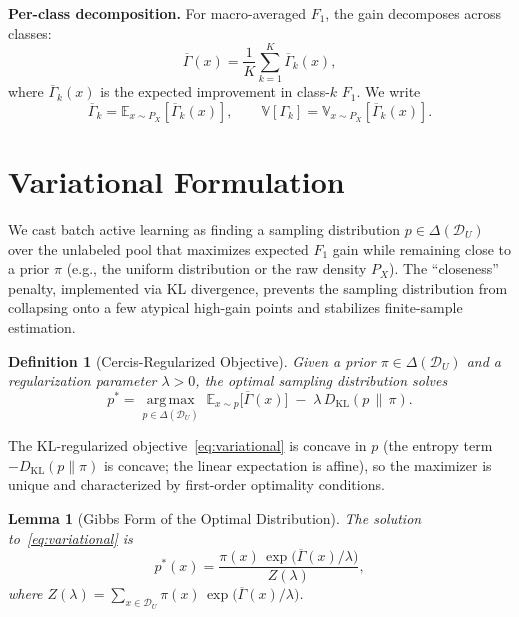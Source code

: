 \documentclass[12pt,a4paper]{article}
\newtheorem{lemma}[theorem]{Lemma}
\newtheorem{definition}[theorem]{Definition}
\newcommand{\E}{\mathbb{E}}
\newcommand{\V}{\mathbb{V}}
\newcommand{\cD}{\mathcal{D}}
\newcommand{\argmax}{\operatorname*{arg\,max}}
\newcommand{\KL}{D_{\mathrm{KL}}}
\begin{document}
\medskip\noindent
\textbf{Per-class decomposition.}
For macro-averaged $F_1$, the gain decomposes across classes:
\begin{equation}\label{eq:decomp}
    \overline{\Gamma}(x) =
    \frac{1}{K}\sum_{k=1}^{K} \overline{\Gamma}_k(x),
\end{equation}
where $\overline{\Gamma}_k(x)$ is the expected improvement in class-$k$
$F_1$.  We write
\begin{equation}\label{eq:class-gain-moments}
    \overline{\Gamma}_k = \E_{x\sim P_X}[\overline{\Gamma}_k(x)],\qquad
    \V[\Gamma_k] = \V_{x\sim P_X}[\overline{\Gamma}_k(x)].
\end{equation}

\section{Variational Formulation}

We cast batch active learning as finding a sampling distribution
$p\in\Delta(\cD_U)$ over the unlabeled pool that maximizes expected $F_1$
gain while remaining close to a prior $\pi$ (e.g., the uniform distribution
or the raw density $P_X$).  The ``closeness'' penalty, implemented via KL
divergence, prevents the sampling distribution from collapsing onto a few
atypical high-gain points and stabilizes finite-sample estimation.

\begin{definition}[Cercis-Regularized Objective]
\label{def:objective}
Given a prior $\pi\in\Delta(\cD_U)$ and a regularization parameter
$\lambda>0$, the optimal sampling distribution solves
\begin{equation}\label{eq:variational}
    p^* = \argmax_{p\in\Delta(\cD_U)}\;
    \E_{x\sim p}\big[\overline{\Gamma}(x)\big]
    \;-\; \lambda\,\KL(p\,\|\,\pi).
\end{equation}
\end{definition}

The KL-regularized objective~\eqref{eq:variational} is concave in $p$ (the
entropy term $-\KL(p\|\pi)$ is concave; the linear expectation is
affine), so the maximizer is unique and characterized by first-order
optimality conditions.

\begin{lemma}[Gibbs Form of the Optimal Distribution]
\label{lem:gibbs}
The solution to~\eqref{eq:variational} is
\begin{equation}\label{eq:gibbs-sol}
    p^*(x) = \frac{\pi(x)\,\exp\!\big(\overline{\Gamma}(x)/\lambda\big)}
                  {Z(\lambda)},
\end{equation}
where $Z(\lambda)=\sum_{x\in\cD_U}\pi(x)\,
\exp\big(\overline{\Gamma}(x)/\lambda\big)$.
\end{lemma}
\end{document}
